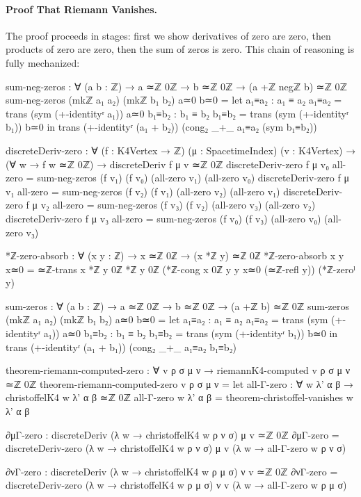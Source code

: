 \documentclass[11pt,a4paper]{book}
\begin{document}
\paragraph{Proof That Riemann Vanishes.}

The proof proceeds in stages: first we show derivatives of zero are zero, then products 
of zero are zero, then the sum of zeros is zero. This chain of reasoning is fully mechanized:

\begin{code}
sum-neg-zeros : ∀ (a b : ℤ) → a ≃ℤ 0ℤ → b ≃ℤ 0ℤ → (a +ℤ negℤ b) ≃ℤ 0ℤ
sum-neg-zeros (mkℤ a₁ a₂) (mkℤ b₁ b₂) a≃0 b≃0 = 
  let a₁≡a₂ : a₁ ≡ a₂
      a₁≡a₂ = trans (sym (+-identityʳ a₁)) a≃0
      b₁≡b₂ : b₁ ≡ b₂
      b₁≡b₂ = trans (sym (+-identityʳ b₁)) b≃0
  in trans (+-identityʳ (a₁ + b₂)) (cong₂ _+_ a₁≡a₂ (sym b₁≡b₂))

discreteDeriv-zero : ∀ (f : K4Vertex → ℤ) (μ : SpacetimeIndex) (v : K4Vertex) →
                     (∀ w → f w ≃ℤ 0ℤ) → discreteDeriv f μ v ≃ℤ 0ℤ
discreteDeriv-zero f μ v₀ all-zero = sum-neg-zeros (f v₁) (f v₀) (all-zero v₁) (all-zero v₀)
discreteDeriv-zero f μ v₁ all-zero = sum-neg-zeros (f v₂) (f v₁) (all-zero v₂) (all-zero v₁)
discreteDeriv-zero f μ v₂ all-zero = sum-neg-zeros (f v₃) (f v₂) (all-zero v₃) (all-zero v₂)
discreteDeriv-zero f μ v₃ all-zero = sum-neg-zeros (f v₀) (f v₃) (all-zero v₀) (all-zero v₃)

*ℤ-zero-absorb : ∀ (x y : ℤ) → x ≃ℤ 0ℤ → (x *ℤ y) ≃ℤ 0ℤ
*ℤ-zero-absorb x y x≃0 = 
  ≃ℤ-trans {x *ℤ y} {0ℤ *ℤ y} {0ℤ} (*ℤ-cong {x} {0ℤ} {y} {y} x≃0 (≃ℤ-refl y)) (*ℤ-zeroˡ y)

sum-zeros : ∀ (a b : ℤ) → a ≃ℤ 0ℤ → b ≃ℤ 0ℤ → (a +ℤ b) ≃ℤ 0ℤ
sum-zeros (mkℤ a₁ a₂) (mkℤ b₁ b₂) a≃0 b≃0 = 
  let a₁≡a₂ : a₁ ≡ a₂
      a₁≡a₂ = trans (sym (+-identityʳ a₁)) a≃0
      b₁≡b₂ : b₁ ≡ b₂
      b₁≡b₂ = trans (sym (+-identityʳ b₁)) b≃0
  in trans (+-identityʳ (a₁ + b₁)) (cong₂ _+_ a₁≡a₂ b₁≡b₂)

theorem-riemann-computed-zero : ∀ v ρ σ μ ν → riemannK4-computed v ρ σ μ ν ≃ℤ 0ℤ
theorem-riemann-computed-zero v ρ σ μ ν = 
  let
      all-Γ-zero : ∀ w λ' α β → christoffelK4 w λ' α β ≃ℤ 0ℤ
      all-Γ-zero w λ' α β = theorem-christoffel-vanishes w λ' α β
      
      ∂μΓ-zero : discreteDeriv (λ w → christoffelK4 w ρ ν σ) μ v ≃ℤ 0ℤ
      ∂μΓ-zero = discreteDeriv-zero (λ w → christoffelK4 w ρ ν σ) μ v 
                   (λ w → all-Γ-zero w ρ ν σ)
      
      ∂νΓ-zero : discreteDeriv (λ w → christoffelK4 w ρ μ σ) ν v ≃ℤ 0ℤ
      ∂νΓ-zero = discreteDeriv-zero (λ w → christoffelK4 w ρ μ σ) ν v
                   (λ w → all-Γ-zero w ρ μ σ)
      

\end{code}
\end{document}

